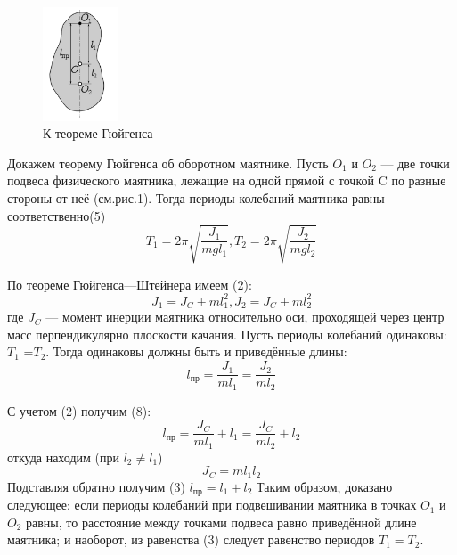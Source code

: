 \documentclass[a4paper]{article}
\begin{document}
\begin{figure}[h]
    \centering
    \includegraphics[width=0.2\textwidth]{pick1.PNG} 
    \caption{К теореме Гюйгенса}
    \end{figure}
    Докажем теорему Гюйгенса об оборотном маятнике. 
Пусть ${O_{1}}$ и ${O_{2}}$ — две точки подвеса физического маятника, лежащие на одной прямой с точкой C по разные стороны от неё (см.рис.1). Тогда периоды колебаний маятника равны соответственно(5)
\[T_{1} = 2\pi \sqrt{\frac{J_{1}}{mgl_{1}} },  T_{2} = 2\pi \sqrt{\frac{J_{2}}{mgl_{2}} } \] 

По теореме Гюйгенса—Штейнера имеем (2):
\[J_{1} = J_{C}+ml^{2}_{1},  J_{2} = J_{C}+ml^{2}_{2} \]
где $J_{C}$ — момент инерции маятника относительно оси, проходящей через 
центр масс перпендикулярно плоскости качания.
Пусть периоды колебаний одинаковы: $T_{1}$ =$T_{2}$. Тогда одинаковы 
должны быть и приведённые длины: \[l_{\text{пр}} = \frac{J_{1}}{ml_{1}}=\frac{J_{2}}{ml_{2}} \]

С учетом (2) получим (8): \[l_{\text{пр}} = \frac{J_{C}}{ml_{1}}+l_{1}=\frac{J_{C}}{ml_{2}}+l_{2} \]
откуда находим (при $l_{2} \neq l_{1}$)
\[J_{C} = ml_{1}l_{2}\]
Подставляя обратно получим (3)
$l_{\text{пр}}=l_{1}+l_{2}$
Таким образом, доказано следующее: если периоды колебаний при подвешивании маятника в точках $O_{1}$ и $O_{2}$ равны, то расстояние между точками 
подвеса равно приведённой длине маятника; и наоборот, из равенства (3)
следует равенство периодов $T_{1} = T_{2}$.
\end{document}
